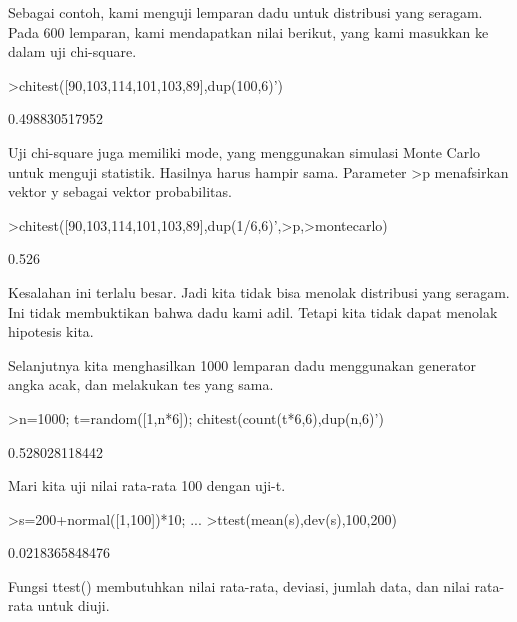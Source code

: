 \documentclass[a4paper,10pt]{article}
\begin{document}
\begin{eulernotebook}
\begin{eulercomment}
Sebagai contoh, kami menguji lemparan dadu untuk distribusi yang
seragam. Pada 600 lemparan, kami mendapatkan nilai berikut, yang kami
masukkan ke dalam uji chi-square.
\end{eulercomment}
\begin{eulerprompt}
>chitest([90,103,114,101,103,89],dup(100,6)')
\end{eulerprompt}
\begin{euleroutput}
  0.498830517952
\end{euleroutput}
\begin{eulercomment}
Uji chi-square juga memiliki mode, yang menggunakan simulasi Monte
Carlo untuk menguji statistik. Hasilnya harus hampir sama. Parameter
\textgreater{}p menafsirkan vektor y sebagai vektor probabilitas.
\end{eulercomment}
\begin{eulerprompt}
>chitest([90,103,114,101,103,89],dup(1/6,6)',>p,>montecarlo)
\end{eulerprompt}
\begin{euleroutput}
  0.526
\end{euleroutput}
\begin{eulercomment}
Kesalahan ini terlalu besar. Jadi kita tidak bisa menolak distribusi
yang seragam. Ini tidak membuktikan bahwa dadu kami adil. Tetapi kita
tidak dapat menolak hipotesis kita.

Selanjutnya kita menghasilkan 1000 lemparan dadu menggunakan generator
angka acak, dan melakukan tes yang sama.
\end{eulercomment}
\begin{eulerprompt}
>n=1000; t=random([1,n*6]); chitest(count(t*6,6),dup(n,6)')
\end{eulerprompt}
\begin{euleroutput}
  0.528028118442
\end{euleroutput}
\begin{eulercomment}
Mari kita uji nilai rata-rata 100 dengan uji-t.
\end{eulercomment}
\begin{eulerprompt}
>s=200+normal([1,100])*10; ...
>ttest(mean(s),dev(s),100,200)
\end{eulerprompt}
\begin{euleroutput}
  0.0218365848476
\end{euleroutput}
\begin{eulercomment}
Fungsi ttest() membutuhkan nilai rata-rata, deviasi, jumlah data, dan
nilai rata-rata untuk diuji.


\end{eulercomment}
\end{eulernotebook}
\end{document}
